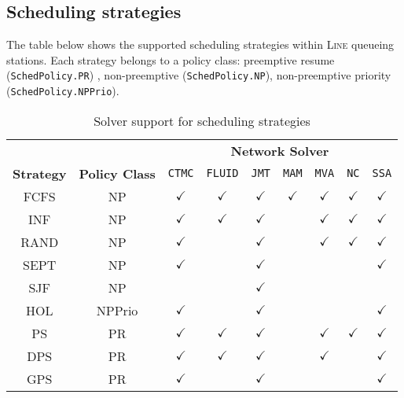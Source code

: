 \subsection{Scheduling strategies}
The table below shows the supported scheduling strategies within \textsc{Line} queueing stations. Each strategy belongs to a policy class: preemptive resume (\texttt{SchedPolicy.PR})%
, non-preemptive (\texttt{SchedPolicy.NP}), non-preemptive priority (\texttt{SchedPolicy.NPPrio}).
\begin{table}[thbp]
\renewcommand{\arraystretch}{1.2}
\centering
\caption{Solver support for scheduling strategies}
\begin{tabular}{|c|c|c|c|c|c|c|c|c|}
\cline{3-9}
\multicolumn{2}{c|}{}&\multicolumn{7}{c|}{\textbf{Network Solver}}\\
\cline{1-9}
\textbf{Strategy}	&\textbf{Policy Class}	&\texttt{CTMC}&\texttt{FLUID} 	&\texttt{JMT} 	&\texttt{MAM}	&\texttt{MVA}	&\texttt{NC}	&\texttt{SSA}	\\
\hline
FCFS &NP	&$\checkmark$			&$\checkmark$	&  $\checkmark$	 	&  $\checkmark$	 & $\checkmark$	&  $\checkmark$		&  $\checkmark$	 \\
\hline
INF	&NP	&$\checkmark$			&$\checkmark$	&  $\checkmark$		& 	 & $\checkmark$ 	&  $\checkmark$		&  $\checkmark$	 \\
\hline
RAND 	&NP	&	$\checkmark$	&	& $\checkmark$	&	&$\checkmark$	& $\checkmark$	& $\checkmark$	\\
\hline
SEPT 	&NP	&		$\checkmark$&	&$\checkmark$&	& &&$\checkmark$	\\
\hline
SJF 	&NP	&			&	& $\checkmark$	&&&&	\\
\hline
HOL & NPPrio &		 $\checkmark$	& 	&$\checkmark$	&&&& $\checkmark$	\\
\hline
PS	&  PR	&$\checkmark$			&$\checkmark$	&  $\checkmark$		&&  $\checkmark$	  	& $\checkmark$	& $\checkmark$	  \\
\hline
DPS	& PR	&	$\checkmark$		&$\checkmark$	&  	$\checkmark$	&&  	 $\checkmark$ 	& 	&$\checkmark$  \\
\hline
GPS	& PR	&$\checkmark$	&  		&  	$\checkmark$  	& & 	& & $\checkmark$ \\
\hline
\end{tabular}
\label{TAB_solver_policies}
\end{table}

